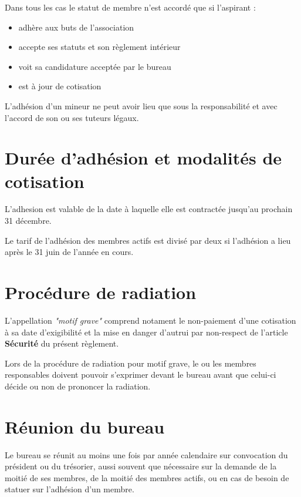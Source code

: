 \documentclass[a4paper, 11pt]{article}
\begin{document}
Dans tous les cas le statut de membre n'est accordé que si l'aspirant :

\begin{itemize}
	\item adhère aux buts de l'association
	\item accepte ses statuts et son règlement intérieur
	\item voit sa candidature acceptée par le bureau
	\item est à jour de cotisation
\end{itemize}

L'adhésion d'un mineur ne peut avoir lieu que sous la responsabilité et avec l'accord de son ou ses tuteurs légaux.


\section{Durée d'adhésion et modalités de cotisation} %

L'adhesion est valable de la date à laquelle elle est contractée jusqu'au prochain 31 décembre.

Le tarif de l'adhésion des membres actifs est divisé par deux si l'adhésion a lieu après le 31 juin de l'année en cours.


\section{Procédure de radiation} %

L'appellation \textit{"motif grave"}  comprend notament le non-paiement d'une cotisation à sa date d'exigibilité et la mise en danger d'autrui par non-respect de l'article \textbf{Sécurité} du présent règlement.

Lors de la procédure de radiation pour motif grave, le ou les membres responsables doivent pouvoir s'exprimer devant le
bureau avant que celui-ci décide ou non de prononcer la radiation.


\section{Réunion du bureau} %

Le bureau se réunit au moins une fois par année calendaire sur convocation du président ou du trésorier, aussi souvent
que nécessaire sur la demande de la moitié de ses membres, de la moitié des membres actifs, ou en cas de besoin de
statuer sur l'adhésion d'un membre.
\end{document}
